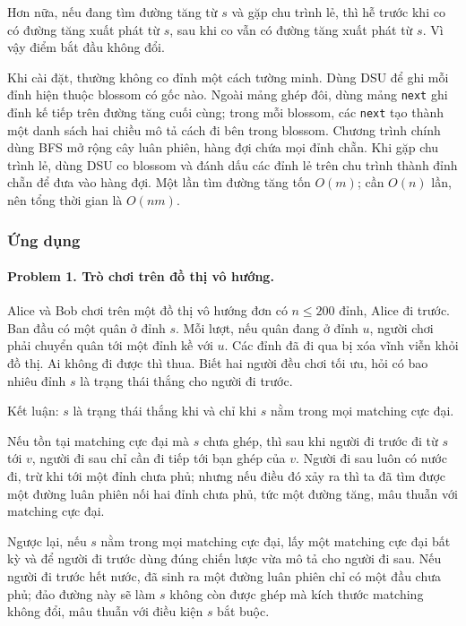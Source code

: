 \documentclass[11pt]{article}
\begin{document}
Hơn nữa, nếu đang tìm đường tăng từ \(s\) và gặp chu trình lẻ, thì hễ trước khi
co có đường tăng xuất phát từ \(s\), sau khi co vẫn có đường tăng xuất phát từ
\(s\). Vì vậy điểm bắt đầu không đổi.

Khi cài đặt, thường không co đỉnh một cách tường minh. Dùng DSU để ghi mỗi đỉnh
hiện thuộc blossom có gốc nào. Ngoài mảng ghép đôi, dùng mảng \texttt{next} ghi
đỉnh kế tiếp trên đường tăng cuối cùng; trong mỗi blossom, các \texttt{next}
tạo thành một danh sách hai chiều mô tả cách đi bên trong blossom. Chương trình
chính dùng BFS mở rộng cây luân phiên, hàng đợi chứa mọi đỉnh chẵn. Khi gặp
chu trình lẻ, dùng DSU co blossom và đánh dấu các đỉnh lẻ trên chu trình thành
đỉnh chẵn để đưa vào hàng đợi. Một lần tìm đường tăng tốn \(O(m)\); cần
\(O(n)\) lần, nên tổng thời gian là \(O(nm)\).

\subsubsection{Ứng dụng}

\paragraph{Problem 1. Trò chơi trên đồ thị vô hướng.}
Alice và Bob chơi trên một đồ thị vô hướng đơn có \(n\le 200\) đỉnh, Alice đi
trước. Ban đầu có một quân ở đỉnh \(s\). Mỗi lượt, nếu quân đang ở đỉnh \(u\),
người chơi phải chuyển quân tới một đỉnh kề với \(u\). Các đỉnh đã đi qua bị
xóa vĩnh viễn khỏi đồ thị. Ai không đi được thì thua. Biết hai người đều chơi
tối ưu, hỏi có bao nhiêu đỉnh \(s\) là trạng thái thắng cho người đi trước.

Kết luận: \(s\) là trạng thái thắng khi và chỉ khi \(s\) nằm trong mọi matching
cực đại.

Nếu tồn tại matching cực đại mà \(s\) chưa ghép, thì sau khi người đi trước đi
từ \(s\) tới \(v\), người đi sau chỉ cần đi tiếp tới bạn ghép của \(v\). Người
đi sau luôn có nước đi, trừ khi tới một đỉnh chưa phủ; nhưng nếu điều đó xảy ra
thì ta đã tìm được một đường luân phiên nối hai đỉnh chưa phủ, tức một đường
tăng, mâu thuẫn với matching cực đại.

Ngược lại, nếu \(s\) nằm trong mọi matching cực đại, lấy một matching cực đại
bất kỳ và để người đi trước dùng đúng chiến lược vừa mô tả cho người đi sau. Nếu
người đi trước hết nước, đã sinh ra một đường luân phiên chỉ có một đầu chưa
phủ; đảo đường này sẽ làm \(s\) không còn được ghép mà kích thước matching không
đổi, mâu thuẫn với điều kiện \(s\) bắt buộc.
\end{document}
